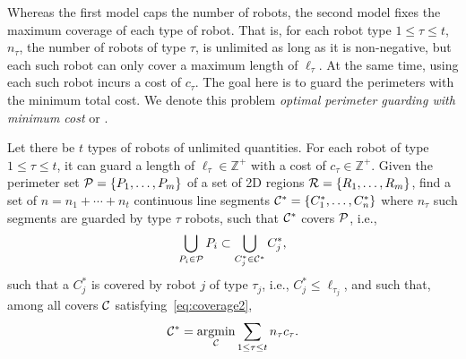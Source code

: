 Whereas the first model caps the number of robots, the second
model fixes the maximum coverage of each type of robot. That is, for 
each robot type $1 \le \tau \le t$, $n_{\tau}$, the number of robots of type $\tau$,
is unlimited as long as it is non-negative, but each such robot can only cover 
a maximum length of $\ell_{\tau}$. 
At the same time, using each such robot incurs a cost of $c_{\tau}$. The 
goal here is to guard the perimeters with the minimum total cost. We 
denote this problem {\em optimal perimeter guarding with minimum 
	cost} or \opgmc. 

\begin{problem} Let there be $t$ types of robots of unlimited quantities. 
	For each robot of type $1\le \tau \le t$, it can guard a length of 
	$\ell_{\tau}\in\mathbb{Z^+}$ with a cost of $c_{\tau}\in\mathbb{Z^+}$. Given the perimeter set
	$\P = \{P_1, \ldots, P_m\}$ of a set of 2D regions $\R =\{R_1, \ldots, 
	R_m\}$, find a set of $n = n_1 + \cdots + n_t$ continuous line segments 
	$\C^* = \{C_1^*, \ldots, C_n^*\}$ where $n_{\tau}$ such segments are 
	guarded by type $\tau$ robots, such that $\C^*$ covers $\P$, i.e., 
	\begin{align}\label{eq:coverage2}
	\bigcup_{P_i \in \P} P_i  \subset \bigcup_{C_j^* \in \C^*} C_j^*,
	\end{align}
	such that a $C_j^*$ is covered by robot $j$ of type $\tau_j$, i.e., 
	$C_j^* \le \ell_{\tau_j}$, and such that,
	among all covers $\C$ satisfying~\eqref{eq:coverage2}, 
	\begin{align}\label{eq:objective2}
	\C^* = \underset{\C}{\mathrm{argmin}} \sum_{1 \le \tau \le t} 
	n_{\tau}c_{\tau}.
	\end{align}
\end{problem}
